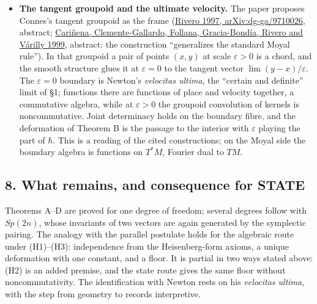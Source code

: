 \documentclass[11pt,a4paper]{article}
\begin{document}
\begin{itemize}
  each partition (the classical elimination, Proposition 2 of the
  \href{refinement-composition-and-limit.md}{refinement note}) and then
  refines; the path integral of eqs. (7)--(8) holds the action
  resolution at a fixed \(h\) while the partition is refined. (The paper
  also writes \(\varepsilon=h\varepsilon'\) after eq. (5), where the
  resolution itself goes to zero; the reading here follows eq. (7).) For
  Newton's quadratic cases both orders converge (the refinement note's
  Proposition 2 and Theorem 3), which is the independence of Theorem A.
  The 1998 conjecture that finiteness forces the joint limit concerns
  the general, non-quadratic case, and it remains open.
\item
  \textbf{The tangent groupoid and the ultimate velocity.} The paper
  proposes Connes's tangent groupoid as the frame
  (\href{https://arxiv.org/abs/dg-ga/9710026}{Rivero 1997,
  arXiv:dg-ga/9710026}, abstract;
  \href{https://doi.org/10.1016/S0393-0440(98)00028-X}{Cariñena,
  Clemente-Gallardo, Follana, Gracia-Bondía, Rivero and Várilly 1999},
  abstract: the construction ``generalizes the standard Moyal rule'').
  In that groupoid a pair of points \((x,y)\) at scale \(\varepsilon>0\)
  is a chord, and the smooth structure glues it at \(\varepsilon=0\) to
  the tangent vector \(\lim(y-x)/\varepsilon\). The \(\varepsilon=0\)
  boundary is Newton's \emph{velocitas ultima}, the ``certain and
  definite'' limit of §1; functions there are functions of place and
  velocity together, a commutative algebra, while at \(\varepsilon>0\)
  the groupoid convolution of kernels is noncommutative. Joint
  determinacy holds on the boundary fibre, and the deformation of
  Theorem B is the passage to the interior with \(\varepsilon\) playing
  the part of \(\hbar\). This is a reading of the cited constructions;
  on the Moyal side the boundary algebra is functions on \(T^*M\),
  Fourier dual to \(TM\).
\end{itemize}

\hypertarget{what-remains-and-consequence-for-state}{%
\subsection{8. What remains, and consequence for
STATE}\label{what-remains-and-consequence-for-state}}

Theorems A--D are proved for one degree of freedom; several degrees
follow with \(Sp(2n)\), whose invariants of two vectors are again
generated by the symplectic pairing. The analogy with the parallel
postulate holds for the algebraic route under (H1)--(H3): independence
from the Heisenberg-form axioms, a unique deformation with one constant,
and a floor. It is partial in two ways stated above: (H2) is an added
premise, and the state route gives the same floor without
noncommutativity. The identification with Newton rests on his
\emph{velocitas ultima}, with the step from geometry to records
interpretive.
\end{document}
